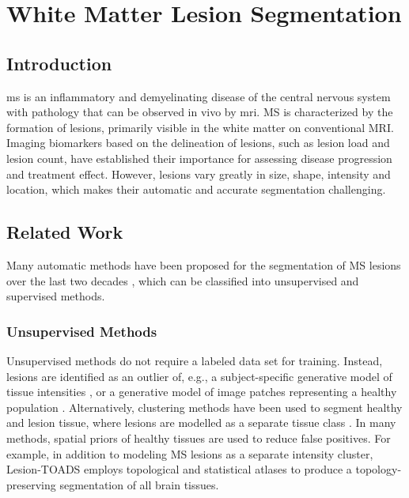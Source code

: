 \chapter{White Matter Lesion Segmentation}
\label{sec:segmentation}

\section{Introduction}

\Gls{ms} is an inflammatory and demyelinating disease of the central nervous
system with pathology that can be observed in vivo by \gls{mri}.
MS is characterized by the formation of lesions, primarily visible in the white
matter on conventional MRI. Imaging biomarkers based on the delineation of
lesions, such as lesion load and lesion count, have established their importance
for assessing disease progression and treatment effect. However, lesions vary
greatly in size, shape, intensity and location, which makes their automatic and
accurate segmentation challenging.

\section[Related work]{Related Work}

Many automatic methods have been proposed for the segmentation of MS
\mbox{lesions} over the last two decades \citep{garcia2013}, which can be
classified into unsupervised and supervised methods.

\subsection[Unsupervised methods]{Unsupervised Methods}

Unsupervised methods do not require a labeled data set for training. Instead,
lesions are identified as an outlier of, e.g., a subject-specific generative
model of tissue intensities
\citep{vanleemput2001,tomas2015,schmidt2012,roura2015}, or a generative
model of image patches representing a healthy population \citep{weiss2013}.
Alternatively, clustering methods have been used to segment healthy and lesion
tissue, where lesions are modelled as a separate tissue class
\citep{shiee2010,sudre2015}. In many methods, spatial priors of healthy
tissues are used to reduce false positives. For example, in addition to
modeling MS lesions as a separate intensity cluster, Lesion-TOADS
\citep{shiee2010} employs topological and statistical atlases to produce
a topology-preserving segmentation of all brain tissues.

